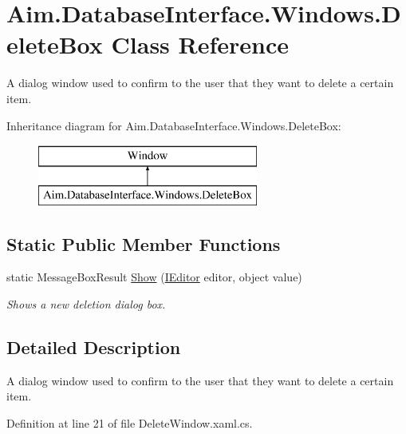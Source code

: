 \hypertarget{class_aim_1_1_database_interface_1_1_windows_1_1_delete_box}{}\section{Aim.\+Database\+Interface.\+Windows.\+Delete\+Box Class Reference}
\label{class_aim_1_1_database_interface_1_1_windows_1_1_delete_box}


A dialog window used to confirm to the user that they want to delete a certain item.  


Inheritance diagram for Aim.\+Database\+Interface.\+Windows.\+Delete\+Box\+:\begin{figure}[H]
\begin{center}
\leavevmode
\includegraphics[height=2.000000cm]{class_aim_1_1_database_interface_1_1_windows_1_1_delete_box}
\end{center}
\end{figure}
\subsection*{Static Public Member Functions}
\begin{DoxyCompactItemize}
\item 
static Message\+Box\+Result \mbox{\hyperlink{class_aim_1_1_database_interface_1_1_windows_1_1_delete_box_a41800b41805d59141dcf13d89aa3cea2}{Show}} (\mbox{\hyperlink{interface_aim_1_1_database_interface_1_1_interfaces_1_1_i_editor}{I\+Editor}} editor, object value)
\begin{DoxyCompactList}\small\item\em Shows a new deletion dialog box. \end{DoxyCompactList}\end{DoxyCompactItemize}


\subsection{Detailed Description}
A dialog window used to confirm to the user that they want to delete a certain item. 



Definition at line 21 of file Delete\+Window.\+xaml.\+cs.



